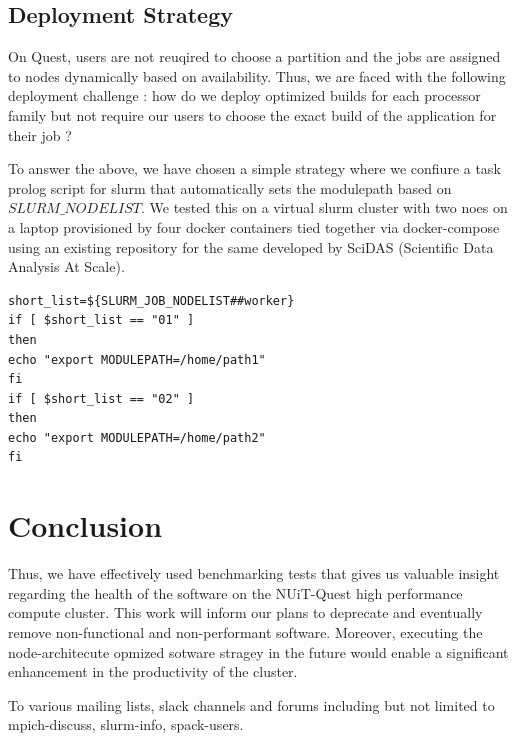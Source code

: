 \documentclass[sigconf,authordraft]{acmart}
\begin{document}
\subsection{Deployment Strategy}
On Quest, users are not reuqired to choose a partition and the jobs are assigned to nodes dynamically based on availability. Thus, we are faced with the following deployment challenge : how do we deploy optimized builds for each processor family but not require our users to choose the exact build of the application for their job ?

To answer the above, we have chosen a simple strategy where we confiure a task prolog script for slurm that automatically sets the modulepath based on $SLURM\_NODELIST$. We tested this on a virtual slurm cluster with two noes on a laptop provisioned by four docker containers tied together via docker-compose using an existing repository \cite{slurmdocker_repository} for the same developed by SciDAS (Scientific Data Analysis At Scale).

\begin{verbatim}
short_list=${SLURM_JOB_NODELIST##worker}
if [ $short_list == "01" ]
then
echo "export MODULEPATH=/home/path1"
fi
if [ $short_list == "02" ]
then
echo "export MODULEPATH=/home/path2"
fi
\end{verbatim}

\section{Conclusion}

Thus, we have effectively used benchmarking tests that gives us valuable insight regarding the health of the software on the NUiT-Quest high performance compute cluster. This work will inform our plans to deprecate and eventually remove non-functional and non-performant software. Moreover, executing the node-architecute opmized sotware stragey in the future would enable a significant enhancement in the productivity of the cluster.

\begin{acks}
To various mailing lists, slack channels and forums including but not limited to mpich-discuss, slurm-info, spack-users.
\end{acks}



\end{document}
